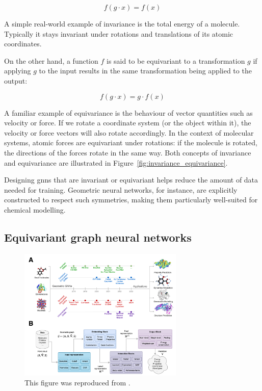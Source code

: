 \begin{equation}
f(g \cdot x) = f(x)
\label{eq:invariance}
\end{equation}

A simple real-world example of invariance is the total energy of a molecule. Typically it stays invariant under rotations and translations of its atomic coordinates.

On the other hand, a function $f$ is said to be equivariant to a transformation $g$ if applying $g$ to the input results in the same transformation being applied to the output:

\begin{equation}
f(g \cdot x) = g \cdot f(x)
\label{eq:equivariance}
\end{equation}

A familiar example of equivariance is the behaviour of vector quantities such as velocity or force. If we rotate a coordinate system (or the object within it), the velocity or force vectors will also rotate accordingly. In the context of molecular systems, atomic forces are equivariant under rotations: if the molecule is rotated, the directions of the forces rotate in the same way. Both concepts of invariance and equivariance are illustrated in Figure~\ref{fig:invariance_equivariance}.

Designing \acp{gnn} that are invariant or equivariant helps reduce the amount of data needed for training. Geometric neural networks, for instance, are explicitly constructed to respect such symmetries, making them particularly well-suited for chemical modelling.

\clearpage
\subsection{Equivariant graph neural networks}

\begin{figure}[b!]
    \centering
    \includegraphics[width=0.7\textwidth]{Figures/2_Theory/equivariant_gnns.png}
    \caption{This figure was reproduced from \citep{duvalHitchhikersGuideGeometric2024}.}
    \label{fig:equivariant_gnns}
\end{figure}